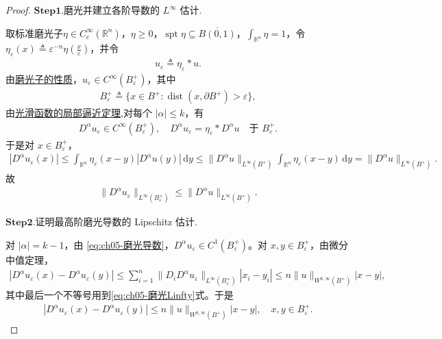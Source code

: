 \documentclass[../../main.tex]{subfiles}
\begin{document}
\begin{proof}
\noindent$\mathbf{Step}\bm{1}$.{\heiti 磨光并建立各阶导数的 $L^{\infty}$ 估计.}

取标准磨光子$\eta\in C_{c}^{\infty}(\mathbb{R}^{n})$，$\eta\geqslant0$，$\operatorname{spt}\eta\subseteq\overline{B(0,1)}$，$\int_{\mathbb{R}^{n}}\eta=1$，令 $\eta_{\varepsilon}(x)\triangleq\varepsilon^{-n}\eta\left( \frac{x}{\varepsilon} \right)$，并令
\begin{align*}
u_{\varepsilon}\triangleq\eta_{\varepsilon}*u.
\end{align*}
由\hyperref[theorem:appC-光滑算子的性质]{磨光子的性质}，$u_{\varepsilon}\in C^{\infty}(B_{\varepsilon}^{+})$，其中
\begin{align*}
B_{\varepsilon}^{+}\triangleq\{x\in B^{+}:\operatorname{dist}(x,\partial B^{+})>\varepsilon\},
\end{align*}
由\hyperref[theorem:ch05-光滑函数的局部逼近定理]{光滑函数的局部逼近定理},对每个 $|\alpha|\leqslant k$，有
\begin{align}
D^{\alpha}u_{\varepsilon}\in C^{\infty}(B_{\varepsilon}^{+}),\quad D^{\alpha}u_{\varepsilon}=\eta_{\varepsilon}*D^{\alpha}u
\quad\text{于 }B_{\varepsilon}^{+}.
\label{eq:ch05-磨光导数}
\end{align}
于是对 $x\in B_{\varepsilon}^{+}$，
\begin{align*}
|D^{\alpha}u_{\varepsilon}(x)|
\leqslant\int_{\mathbb{R}^{n}}\eta_{\varepsilon}(x-y)|D^{\alpha}u(y)|\,\mathrm{d}y
\leqslant\|D^{\alpha}u\|_{L^{\infty}(B^{+})}\int_{\mathbb{R}^{n}}\eta_{\varepsilon}(x-y)\,\mathrm{d}y=\|D^{\alpha}u\|_{L^{\infty}(B^{+})}.
\end{align*}
故
\begin{align}
\|D^{\alpha}u_{\varepsilon}\|_{L^{\infty}(B_{\varepsilon}^{+})}
\leqslant\|D^{\alpha}u\|_{L^{\infty}(B^{+})}.
\label{eq:ch05-磨光Linfty}
\end{align}

\noindent$\mathbf{Step}\bm{2}$.{\heiti 证明最高阶磨光导数的 Lipschitz 估计.}

对 $|\alpha|=k-1$，由 \eqref{eq:ch05-磨光导数}，$D^{\alpha}u_{\varepsilon}\in C^{1}(B_{\varepsilon}^{+})$。对 $x,y\in B_{\varepsilon}^{+}$，由微分中值定理，
\begin{align*}
|D^{\alpha}u_{\varepsilon}(x)-D^{\alpha}u_{\varepsilon}(y)|
\leqslant\sum_{i=1}^{n}\|D_iD^{\alpha}u_{\varepsilon}\|_{L^{\infty}(B_{\varepsilon}^{+})}|x_i-y_i|
\leqslant n\|u\|_{W^{k,\infty}(B^{+})}|x-y|,
\end{align*}
其中最后一个不等号用到\eqref{eq:ch05-磨光Linfty}式。于是
\begin{align}
|D^{\alpha}u_{\varepsilon}(x)-D^{\alpha}u_{\varepsilon}(y)|
\leqslant n\|u\|_{W^{k,\infty}(B^{+})}|x-y|,\quad x,y\in B_{\varepsilon}^{+}.
\label{eq:ch05-磨光Lipschitz}
\end{align}


\end{proof}
\end{document}
